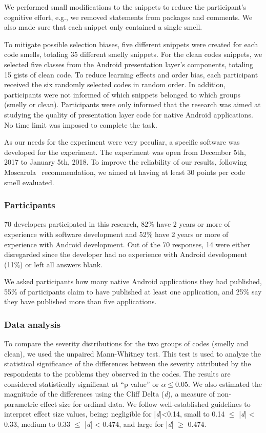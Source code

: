 We performed small modifications to the snippets to reduce the participant's cognitive effort, e.g., we removed statements from packages and comments. We also made sure that each snippet only contained a single smell.

To mitigate possible selection biases, five different snippets were created for each code smells, totaling 35 different smelly snippets. For the clean codes snippets, we selected five classes from the Android presentation layer's components, totaling 15 gists of clean code. 
To reduce learning effects and order bias, each participant received the six randomly selected codes in random order. In addition, participants were not informed of which snippets belonged to which groups (smelly or clean). Participants were only informed that the research was aimed at studying the quality of presentation layer code for native Android applications. No time limit was imposed to complete the task.

As our needs for the experiment were very peculiar, a specific software was developed for the experiment. 
The experiment was open from December 5th, 2017 to January 5th, 2018.  To improve the reliability of our results, following Moscarola~\cite{Moscarola:90} recommendation, we aimed at having at least  30 points per code smell evaluated. 


\subsubsection{Participants}
\label{etapa-3-participantes-analise}

70 developers participated in this research, 82\% have 2 years or more of experience with software development and 52\% have 2 years or more of experience with Android development. Out of the 70 responses, 14 were either disregarded since the developer had no experience with Android development (11\%) or left all answers blank.

We asked participants how many native Android applications they had published, 55\% of participants claim to have published at least one application, and 25\% say they have published more than five applications.


\subsubsection{Data analysis}

To compare the severity distributions for the two groups of codes (smelly and clean), we used the unpaired Mann-Whitney\cite{Conover:99} test. This test is used to analyze the statistical significance of the differences between the severity attributed by the respondents to the problems they observed in the codes. The results are considered statistically significant at ``p value'' or $\alpha \leq  0.05$. We also estimated the magnitude of the differences using the Cliff Delta (\textit{d}), a measure of non-parametric effect size \cite{EffectSize:05} for ordinal data. We follow well-established guidelines \cite {EffectSize:05} to interpret effect size values, being: negligible for |\textit{d}|<0.14, small to 0.14 $\leq$ |\textit{d}| < 0.33, medium to 0.33 $\leq$ |\textit{d}| < 0.474, and large for |\textit{d}| $\geq$ 0.474. 

